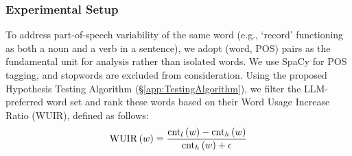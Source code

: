 \subsubsection{Experimental Setup}


To address part-of-speech variability of the same word (e.g., `record' functioning as both a noun and a verb in a sentence), we adopt (word, POS) pairs as the fundamental unit for analysis rather than isolated words. We use SpaCy for POS tagging, and stopwords are excluded from consideration. 
Using the proposed Hypothesis Testing Algorithm (\S\ref{app:TestingAlgorithm}), we filter the LLM-preferred word set and rank these words based on their Word Usage Increase Ratio (WUIR), defined as follows:
\begin{equation}
    \mathrm{WUIR}\left(w\right) ={
    \small{\frac{\mathrm{cnt}_l\left( w \right) -\mathrm{cnt}_h\left(w\right)}{\mathrm{cnt}_h\left(w\right) +\epsilon}}}
\end{equation}





